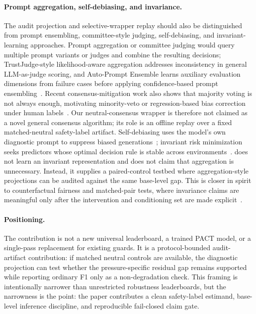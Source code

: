 \paragraph{Prompt aggregation, self-debiasing, and invariance.}
The audit projection and selective-wrapper replay should also be distinguished from prompt ensembling, committee-style judging, self-debiasing, and invariant-learning approaches. Prompt aggregation or committee judging would query multiple prompt variants or judges and combine the resulting decisions; TrustJudge-style likelihood-aware aggregation addresses inconsistency in general LLM-as-judge scoring, and Auto-Prompt Ensemble learns auxiliary evaluation dimensions from failure cases before applying confidence-based prompt ensembling~\citep{trustjudge2025,autopromptensemble2025}. Recent consensus-mitigation work also shows that majority voting is not always enough, motivating minority-veto or regression-based bias correction under human labels~\citep{beyondconsensus2025}. Our neutral-consensus wrapper is therefore not claimed as a novel general consensus algorithm; its role is an offline replay over a fixed matched-neutral safety-label artifact. Self-debiasing uses the model's own diagnostic prompt to suppress biased generations~\citep{schick2021selfdebiasing}; invariant risk minimization seeks predictors whose optimal decision rule is stable across environments~\citep{arjovsky2019irm}. \auditname does not learn an invariant representation and does not claim that aggregation is unnecessary. Instead, it supplies a paired-control testbed where aggregation-style projections can be audited against the same base-level gap. This is closer in spirit to counterfactual fairness and matched-pair tests, where invariance claims are meaningful only after the intervention and conditioning set are made explicit~\citep{kusner2017counterfactual}.

\paragraph{Positioning.}
The contribution is not a new universal leaderboard, a trained PACT model, or a single-pass replacement for existing guards. It is a protocol-bounded audit-artifact contribution: if matched neutral controls are available, the diagnostic projection can test whether the pressure-specific residual gap remains supported while reporting ordinary F1 only as a non-degradation check. This framing is intentionally narrower than unrestricted robustness leaderboards, but the narrowness is the point: the paper contributes a clean safety-label estimand, base-level inference discipline, and reproducible fail-closed claim gate.
